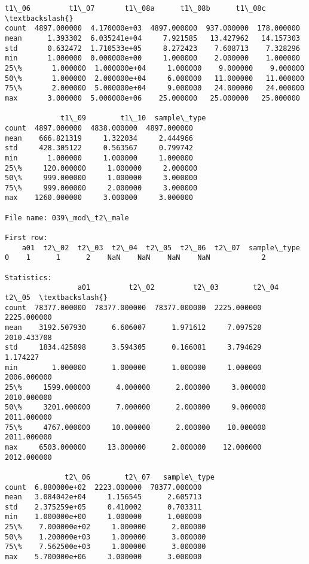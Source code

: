 \documentclass[11pt]{article}
\begin{document}
\begin{Verbatim}[commandchars=\\\{\}]
             t1\_06         t1\_07       t1\_08a      t1\_08b      t1\_08c  \textbackslash{}
count  4897.000000  4.170000e+03  4897.000000  937.000000  178.000000   
mean      1.393302  6.035241e+04     7.921585   13.427962   14.157303   
std       0.632472  1.710533e+05     8.272423    7.608713    7.328296   
min       1.000000  0.000000e+00     1.000000    2.000000    1.000000   
25\%       1.000000  1.000000e+04     1.000000    9.000000    9.000000   
50\%       1.000000  2.000000e+04     6.000000   11.000000   11.000000   
75\%       2.000000  5.000000e+04     9.000000   24.000000   24.000000   
max       3.000000  5.000000e+06    25.000000   25.000000   25.000000   

             t1\_09        t1\_10  sample\_type  
count  4897.000000  4838.000000  4897.000000  
mean    666.821319     1.322034     2.444966  
std     428.305122     0.563567     0.799742  
min       1.000000     1.000000     1.000000  
25\%     120.000000     1.000000     2.000000  
50\%     999.000000     1.000000     3.000000  
75\%     999.000000     2.000000     3.000000  
max    1260.000000     3.000000     3.000000  

File name: 039\_mod\_t2\_male

First row: 
    a01  t2\_02  t2\_03  t2\_04  t2\_05  t2\_06  t2\_07  sample\_type
0    1      1      2    NaN    NaN    NaN    NaN            2

Statistics: 
                 a01         t2\_02         t2\_03        t2\_04        t2\_05  \textbackslash{}
count  78377.000000  78377.000000  78377.000000  2225.000000  2225.000000   
mean    3192.507930      6.606007      1.971612     7.097528  2010.433708   
std     1834.425898      3.594305      0.166081     3.794629     1.174227   
min        1.000000      1.000000      1.000000     1.000000  2006.000000   
25\%     1599.000000      4.000000      2.000000     3.000000  2010.000000   
50\%     3201.000000      7.000000      2.000000     9.000000  2011.000000   
75\%     4767.000000     10.000000      2.000000    10.000000  2011.000000   
max     6503.000000     13.000000      2.000000    12.000000  2012.000000   

              t2\_06        t2\_07   sample\_type  
count  6.880000e+02  2223.000000  78377.000000  
mean   3.084042e+04     1.156545      2.605713  
std    2.375259e+05     0.410002      0.703311  
min    1.000000e+00     1.000000      1.000000  
25\%    7.000000e+02     1.000000      2.000000  
50\%    1.200000e+03     1.000000      3.000000  
75\%    7.562500e+03     1.000000      3.000000  
max    5.700000e+06     3.000000      3.000000  


\end{Verbatim}
\end{document}
